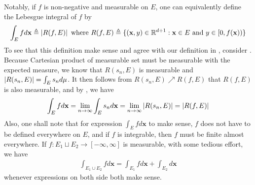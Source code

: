\documentclass{report}
\begin{document}
\begin{mdframed}
Notably, if $f$ is non-negative and measurable on $E$, one can equivalently define the Lebesgue integral of $f$ by 
\begin{align*}
\int_E fd\textbf{x}\triangleq \left|R(f,E)\right|\text{ where } R(f,E)\triangleq \{ (\textbf{x},y)\in\mathbb{R}^{d+1}: \textbf{x}\in E\text{ and }y \in [0,f(\textbf{x})) \}
\end{align*}
To see that this definition make sense and agree with our definition in , consider . Because Cartesian product of measurable set must be measurable with the expected measure, we know that $R(s_n,E)$ is measurable and $\left|R(s_n,E)\right|=\int_E s_nd\mu$. It then follows from $R(s_n,E)\nearrow R(f,E)$ that $R(f,E)$ is also measurable, and by , we have 
\begin{align*}
\int_Efd\textbf{x}= \lim_{n\to \infty}\int_E s_n d\textbf{x} = \lim_{n\to \infty} \left|R(s_n,E)\right|=\left|R(f,E)\right|
\end{align*}
Also, one shall note that for expression $\int_E fd\textbf{x}$ to make sense, $f$ does not have to be defined everywhere on $E$, and if  $f$ is integrable, then $f$ must be finite almost everywhere. If $f:E_1\sqcup  E_2\rightarrow [-\infty,\infty]$ is measurable, with some tedious effort, we have
\begin{align*}
\int_{E_1\cup E_2}fd\textbf{x}=\int_{E_1}fd\textbf{x} +\int_{E_2}d\textbf{x}
\end{align*}
whenever expressions on both side both make sense. 
\end{mdframed}
\end{document}
